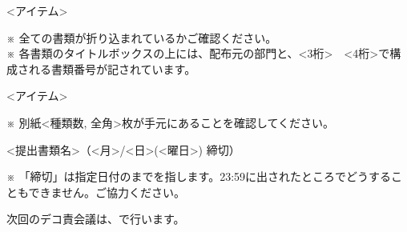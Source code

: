 \pagestyle{empty}

\begin{multicols*}{2}
\setlength{\columnseprule}{0pt}

\begin{enumsquarebrackets}
    \item <アイテム>
\end{enumsquarebrackets}
※ 全ての書類が折り込まれているかご確認ください。\\
\noindent ※ 各書類のタイトルボックスの上には、配布元の部門と、<3桁>~\boldtext{-}~<4桁>で構成される書類番号が記されています。

\begin{enumsquarebrackets}
    \item <アイテム>
\end{enumsquarebrackets}
※ 別紙<種類数, 全角>枚が手元にあることを確認してください。

\newcolumn
{}
\begin{enumsquarebrackets}
    \item <提出書類名>（<月>/<日>(<曜日>) 締切）
\end{enumsquarebrackets}
※ 「締切」は指定日付のまでを指します。23:59に出されたところでどうすることもできません。ご協力ください。

\begin{reitemize}
    \item 次回のデコ責会議は、で行います。
\end{reitemize}

\end{multicols*}
